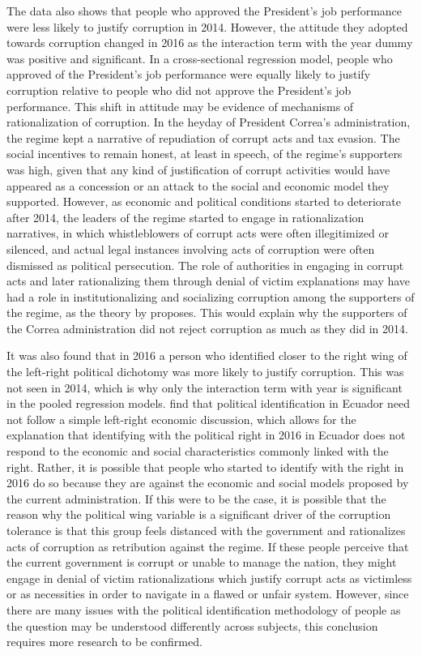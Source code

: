 \documentclass[floatsintext,man]{apa7}\usepackage[]{graphicx}\usepackage[]{color}
\begin{document}
The data also shows that people who approved the President's job performance were less likely to justify corruption in 2014. However, the attitude they adopted towards corruption changed in 2016 as the interaction term with the year dummy was positive and significant. In a cross-sectional regression model, people who approved of the President's job performance were equally likely to justify corruption relative to people who did not approve the President's job performance. This shift in attitude may be evidence of mechanisms of rationalization of corruption. In the heyday of President Correa's administration, the regime kept a narrative of repudiation of corrupt acts and tax evasion. The social incentives to remain honest, at least in speech, of the regime's supporters was high, given that any kind of justification of corrupt activities would have appeared as a concession or an attack to the social and economic model they supported. However, as economic and political conditions started to deteriorate after 2014, the leaders of the regime started to engage in rationalization narratives, in which whistleblowers of corrupt acts were often illegitimized or silenced, and actual legal instances involving acts of corruption were often dismissed as political persecution. The role of authorities in engaging in corrupt acts and later rationalizing them through denial of victim explanations may have had a role in institutionalizing and socializing corruption among the supporters of the regime, as the theory by \textcite{Ashforth.2003} proposes. This would explain why the supporters of the Correa administration did not reject corruption as much as they did in 2014. 

It was also found that in 2016 a person who identified closer to the right wing of the left-right political dichotomy was more likely to justify corruption. This was not seen in 2014, which is why only the interaction term with year is significant in the pooled regression models. \textcite{Moncagatta.2020b} find that political identification in Ecuador need not follow a simple left-right economic discussion, which allows for the explanation that identifying with the political right in 2016 in Ecuador does not respond to the economic and social characteristics commonly linked with the right. Rather, it is possible that people who started to identify with the right in 2016 do so because they are against the economic and social models proposed by the current administration. If this were to be the case, it is possible that the reason why the political wing variable is a significant driver of the corruption tolerance is that this group feels distanced with the government and rationalizes acts of corruption as retribution against the regime. If these people perceive that the current government is corrupt or unable to manage the nation, they might engage in denial of victim rationalizations which justify corrupt acts as victimless or as necessities in order to navigate in a flawed or unfair system. However, since there are many issues with the political identification methodology of people as the question may be understood differently across subjects, this conclusion requires more research to be confirmed. 
\end{document}
